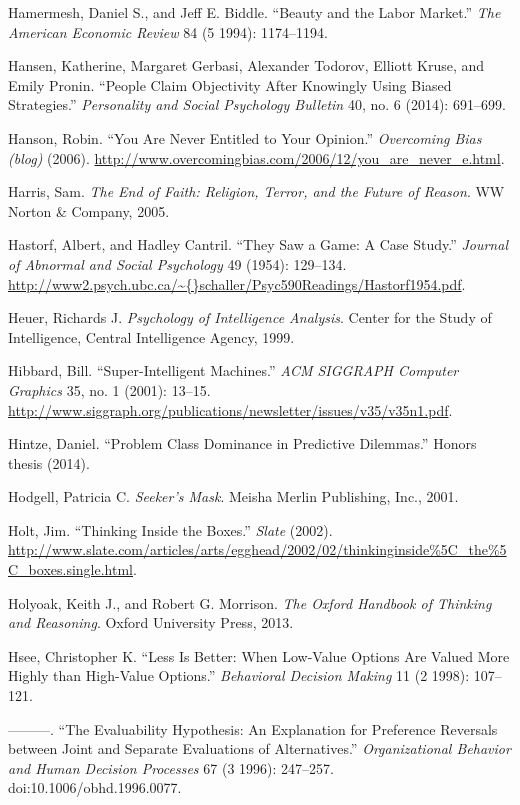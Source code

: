 \documentclass[letterpaper]{book}
\begin{document}
{
 Hamermesh, Daniel S., and Jeff E. Biddle.
``Beauty and the Labor Market.''
\textit{The American Economic Review} 84 (5 1994): 1174--1194.}

{
 Hansen, Katherine, Margaret Gerbasi, Alexander Todorov, Elliott
Kruse, and Emily Pronin. ``People Claim Objectivity
After Knowingly Using Biased Strategies.''
\textit{Personality and Social Psychology Bulletin} 40, no. 6 (2014):
691--699.}

{
 Hanson, Robin. ``You Are Never Entitled to Your
Opinion.'' \textit{Overcoming Bias (blog)} (2006).
\url{http://www.overcomingbias.com/2006/12/you\_are\_never\_e.html}.}

{
 Harris, Sam. \textit{The End of Faith: Religion, Terror, and the
Future of Reason}. WW Norton \& Company, 2005.}

{
 Hastorf, Albert, and Hadley Cantril. ``They Saw a
Game: A Case Study.'' \textit{Journal of Abnormal and
Social Psychology} 49 (1954): 129--134.
\url{http://www2.psych.ubc.ca/\~{}schaller/Psyc590Readings/Hastorf1954.pdf}.}

{
 Heuer, Richards J. \textit{Psychology of Intelligence Analysis}.
Center for the Study of Intelligence, Central Intelligence Agency,
1999.}

{
 Hibbard, Bill. ``Super-Intelligent
Machines.'' \textit{ACM SIGGRAPH Computer Graphics}
35, no. 1 (2001): 13--15.
\url{http://www.siggraph.org/publications/newsletter/issues/v35/v35n1.pdf}.}

{
 Hintze, Daniel. ``Problem Class Dominance in
Predictive Dilemmas.'' Honors thesis (2014).}

{
 Hodgell, Patricia C. \textit{Seeker's Mask}.
Meisha Merlin Publishing, Inc., 2001.}

{
 Holt, Jim. ``Thinking Inside the
Boxes.'' \textit{Slate} (2002).
\url{http://www.slate.com/articles/arts/egghead/2002/02/thinkinginside\%5C\_the\%5C\_boxes.single.html}.}

{
 Holyoak, Keith J., and Robert G. Morrison. \textit{The Oxford
Handbook of Thinking and Reasoning}. Oxford University Press, 2013.}

{
 Hsee, Christopher K. ``Less Is Better: When
Low-Value Options Are Valued More Highly than High-Value
Options.'' \textit{Behavioral Decision Making} 11 (2
1998): 107--121.}

{
 {}---{}---{}---. ``The Evaluability Hypothesis:
An Explanation for Preference Reversals between Joint and Separate
Evaluations of Alternatives.'' \textit{Organizational
Behavior and Human Decision Processes} 67 (3 1996): 247--257.
doi:10.1006/obhd.1996.0077.}
\end{document}
